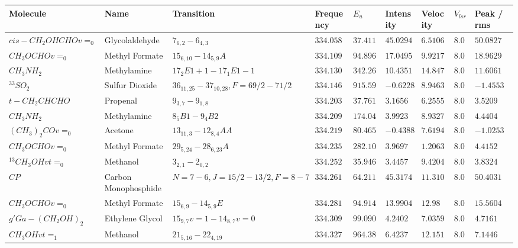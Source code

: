 \documentclass[10pt]{article}
\begin{document}
\begin{landscape}
\begin{table}[htb]
\small
    \centering    
    \begin{tabular}{l l l l l l l l l} 

\hline
Molecule & Name & Transition & Frequency & $E_{{u}}$ & Intensity & Velocity & $V_{{lsr}}$ & Peak / rms \\
\hline
$cis-CH_{2}OHCHOv=_{0}$ & Glycolaldehyde & $7_{6,2}-6_{4,3}$ & $334.05821$ & $37.4116$ & $45.0294$ & $6.5106$ & $8.0$ & $50.0827$\\
$CH_{3}OCHOv=_{0}$ & Methyl Formate & $15_{6,10}-14_{5,9}A$ & $334.10909$ & $94.8964$ & $17.0495$ & $9.9217$ & $8.0$ & $18.9629$\\
$CH_{3}NH_{2}$ & Methylamine & $17_{2}E1+1-17_{1}E1-1$ & $334.13094$ & $342.265$ & $10.4351$ & $14.8478$ & $8.0$ & $11.6061$\\
$^{33}SO_{2}$ & Sulfur Dioxide & $36_{11,25}-37_{10,28},F=69/2-71/2$ & $334.14626$ & $915.5991$ & $-0.6228$ & $8.9463$ & $8.0$ & $-1.4553$\\
$t-CH_{2}CHCHO$ & Propenal & $9_{3,7}-9_{1,8}$ & $334.20301$ & $37.7617$ & $3.1656$ & $6.2555$ & $8.0$ & $3.5209$\\
$CH_{3}NH_{2}$ & Methylamine & $8_{5}B1-9_{4}B2$ & $334.20979$ & $174.0493$ & $3.9923$ & $8.9327$ & $8.0$ & $4.4404$\\
$(CH_{3})_{2}COv=_{0}$ & Acetone & $13_{11,3}-12_{8,4}AA$ & $334.21979$ & $80.4654$ & $-0.4388$ & $7.6194$ & $8.0$ & $-1.0253$\\
$CH_{3}OCHOv=_{0}$ & Methyl Formate & $29_{5,24}-28_{6,23}A$ & $334.23598$ & $282.1007$ & $3.9697$ & $1.2063$ & $8.0$ & $4.4152$\\
$^{13}CH_{3}OHvt=_{0}$ & Methanol & $3_{2,1}-2_{0,2}$ & $334.25221$ & $35.9468$ & $3.4457$ & $9.4204$ & $8.0$ & $3.8324$\\
$CP$ & Carbon Monophosphide & $N=7-6,J=15/2-13/2,F=8-7$ & $334.26182$ & $64.2111$ & $45.3174$ & $11.3104$ & $8.0$ & $50.4031$\\
$CH_{3}OCHOv=_{0}$ & Methyl Formate & $15_{6,9}-14_{5,9}E$ & $334.28144$ & $94.9147$ & $13.9904$ & $12.98$ & $8.0$ & $15.5604$\\
$g'Ga-(CH_{2}OH)_{2}$ & Ethylene Glycol & $15_{9,7}v=1-14_{8,7}v=0$ & $334.30955$ & $99.0907$ & $4.2402$ & $7.0359$ & $8.0$ & $4.7161$\\
$CH_{3}OHvt=_{1}$ & Methanol & $21_{5,16}-22_{4,19}$ & $334.32728$ & $964.3871$ & $6.4237$ & $12.1515$ & $8.0$ & $7.1446$\\

\end{tabular}
\end{table}
\end{landscape}
\end{document}
